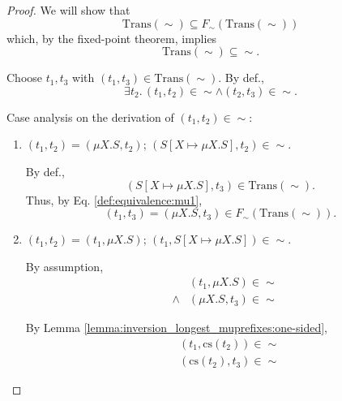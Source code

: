 \documentclass{llncs}
\newcommand*{\Trans}{\mathrm{Trans}}
\newcommand*{\cs}{\mathrm{cs}}
\newcommand*{\sequiv}{\sim}
\renewcommand*{\|}{\;|\;}
\begin{document}
\begin{proof}
  We will show that
  \begin{equation*}
    \Trans(\sequiv) \subseteq F_\sequiv(\Trans(\sequiv))
  \end{equation*}
  which, by the fixed-point theorem, implies
  \begin{equation*}
    \Trans(\sequiv) \subseteq \sequiv.
  \end{equation*}

  Choose $t_1, t_3$ with $(t_1, t_3) \in \Trans(\sequiv)$. 
  By def.,
  \begin{equation*}
    \exists t_2.\, (t_1, t_2) \in \sequiv \land (t_2, t_3) \in \sequiv.
  \end{equation*}

  Case analysis on the derivation of $(t_1, t_2) \in \sequiv$:
  \begin{enumerate}
    \item
      \label{case:transitivity:mu1}
      $(t_1, t_2) = (\mu X.S, t_2)$; $(S[X \mapsto \mu X.S], t_2) \in \sequiv$.

      By def.,
      \begin{equation*}
        (S[X \mapsto \mu X.S], t_3) \in \Trans(\sequiv).
      \end{equation*}
      Thus, by Eq. \ref{def:equivalence:mu1},
      \begin{equation*}
        (t_1, t_3) = (\mu X.S, t_3) \in F_\sequiv(\Trans(\sequiv)).
      \end{equation*}

    \item
      \label{case:transitivity:mu2}
      $(t_1, t_2) = (t_1, \mu X.S)$; $(t_1, S[X \mapsto \mu X.S]) \in \sequiv$.

      By assumption,
      \begin{eqnarray*}
        &&      (t_1, \mu X.S) \in \sequiv \\
        &\land& (\mu X.S, t_3) \in \sequiv
      \end{eqnarray*}

      By Lemma \ref{lemma:inversion_longest_muprefixes:one-sided},
      \begin{eqnarray*}
        && (t_1, \cs(t_2)) \in \sequiv \\
        && (\cs(t_2), t_3) \in \sequiv
      \end{eqnarray*}


\end{enumerate}
\end{proof}
\end{document}

